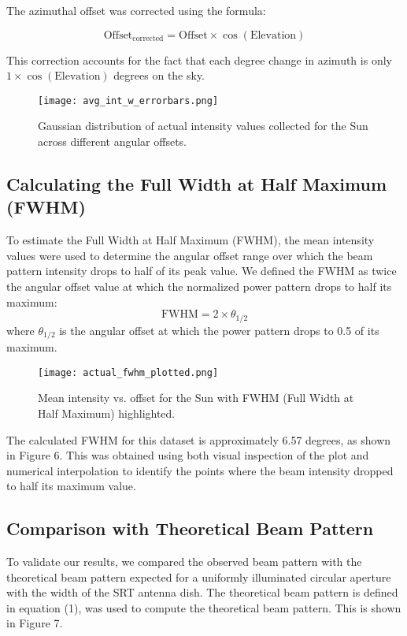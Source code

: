 \documentclass[linenumbers,twocolumn]{aastex631}
\begin{document}
The azimuthal offset was corrected using the formula:

\begin{equation}
    \text{Offset}_{\text{corrected}} = \text{Offset} \times \cos(\text{Elevation})
\end{equation}

This correction accounts for the fact that each degree change in azimuth is only \(1 \times \cos(\text{Elevation})\) degrees on the sky.

\begin{figure}[h]
    \centering
    \texttt{[image: avg\_int\_w\_errorbars.png]}
    \caption{Gaussian distribution of actual intensity values collected for the Sun across different angular offsets.}
    \label{fig:gaussian_distribution}
\end{figure}

\subsection{Calculating the Full Width at Half Maximum (FWHM)}
To estimate the Full Width at Half Maximum (FWHM), the mean intensity values were used to determine the angular offset range over which the beam pattern intensity drops to half of its peak value. We defined the FWHM as twice the angular offset value at which the normalized power pattern drops to half its maximum:
\begin{equation}
    \text{FWHM} = 2 \times \theta_{1/2}
\end{equation}
where \( \theta_{1/2} \) is the angular offset at which the power pattern drops to 0.5 of its maximum. 
\begin{figure}[h]
    \centering
    \texttt{[image: actual\_fwhm\_plotted.png]}
    \caption{Mean intensity vs. offset for the Sun with FWHM (Full Width at Half Maximum) highlighted.}
    \label{fig:mean_int_w_beam_width}
\end{figure}
The calculated FWHM for this dataset is approximately 6.57 degrees, as shown in Figure 6. This was obtained using both visual inspection of the plot and numerical interpolation to identify the points where the beam intensity dropped to half its maximum value.

\subsection{Comparison with Theoretical Beam Pattern}
To validate our results, we compared the observed beam pattern with the theoretical beam pattern expected for a uniformly illuminated circular aperture with the width of the SRT antenna dish. The theoretical beam pattern is defined in equation (1), was used to compute the theoretical beam pattern. This is shown in Figure 7.
\end{document}

